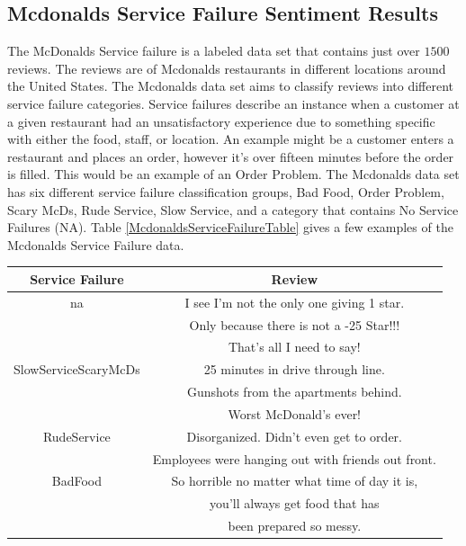 \documentclass[titlepage,letterpaper]{article}
\begin{document}
\subsection{Mcdonalds Service Failure Sentiment Results}

The McDonalds Service failure is a labeled data set that contains just over $1500$ reviews. The reviews are of Mcdonalds restaurants in different locations around the United States. The Mcdonalds data set aims to classify reviews into different service failure categories. Service failures describe an instance when a customer at a given restaurant had an unsatisfactory experience due to something specific with either the food, staff, or location. An example might be a customer enters a restaurant and places an order, however it's over fifteen minutes before the order is filled. This would be an example of an Order Problem. The Mcdonalds data set has six different service failure classification groups, Bad Food, Order Problem, Scary McDs, Rude Service, Slow Service, and a category that contains No Service Failures (NA). Table \cref{McdonaldsServiceFailureTable} gives a few examples of the Mcdonalds Service Failure data. 


 \begin{center}
	\centering
	\begin{tabular}{ |c|c| } 
		\hline
		Service Failure & Review \\
		\hline \hline
		na & I see I'm not the only one giving 1 star. \\
		 & Only because there is not a -25 Star!!! \\
		  & That's all I need to say! \\
		\hline
		SlowServiceScaryMcDs &  25 minutes in drive through line. \\
		& Gunshots from the apartments behind. \\
		& Worst McDonald's ever! \\
		\hline
		RudeService & Disorganized. Didn't even get to order. \\
		& Employees were hanging out with friends out front.  \\ 
		\hline
		BadFood & So horrible no matter what time of day it is, \\
		& you'll always get food that has \\ 
		& been prepared so messy. \\
		\hline
	\end{tabular}
	\label{McdonaldsServiceFailureTable}
\end{center}
\end{document}
